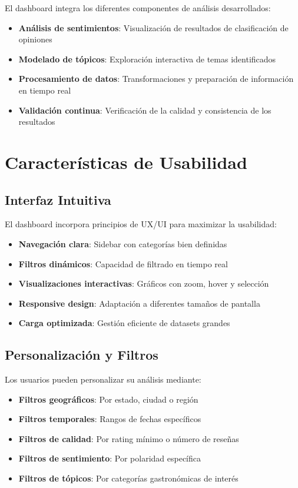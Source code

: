\documentclass[12pt,a4paper,twoside,openany]{book}
\begin{document}
El dashboard integra los diferentes componentes de análisis desarrollados:

\begin{itemize}
    \item \textbf{Análisis de sentimientos}: Visualización de resultados de clasificación de opiniones
    \item \textbf{Modelado de tópicos}: Exploración interactiva de temas identificados
    \item \textbf{Procesamiento de datos}: Transformaciones y preparación de información en tiempo real
    \item \textbf{Validación continua}: Verificación de la calidad y consistencia de los resultados
\end{itemize}

\section{Características de Usabilidad}

\subsection{Interfaz Intuitiva}

El dashboard incorpora principios de UX/UI para maximizar la usabilidad:

\begin{itemize}
    \item \textbf{Navegación clara}: Sidebar con categorías bien definidas
    \item \textbf{Filtros dinámicos}: Capacidad de filtrado en tiempo real
    \item \textbf{Visualizaciones interactivas}: Gráficos con zoom, hover y selección
    \item \textbf{Responsive design}: Adaptación a diferentes tamaños de pantalla
    \item \textbf{Carga optimizada}: Gestión eficiente de datasets grandes
\end{itemize}

\subsection{Personalización y Filtros}

Los usuarios pueden personalizar su análisis mediante:

\begin{itemize}
    \item \textbf{Filtros geográficos}: Por estado, ciudad o región
    \item \textbf{Filtros temporales}: Rangos de fechas específicos
    \item \textbf{Filtros de calidad}: Por rating mínimo o número de reseñas
    \item \textbf{Filtros de sentimiento}: Por polaridad específica
    \item \textbf{Filtros de tópicos}: Por categorías gastronómicas de interés
\end{itemize}
\end{document}
